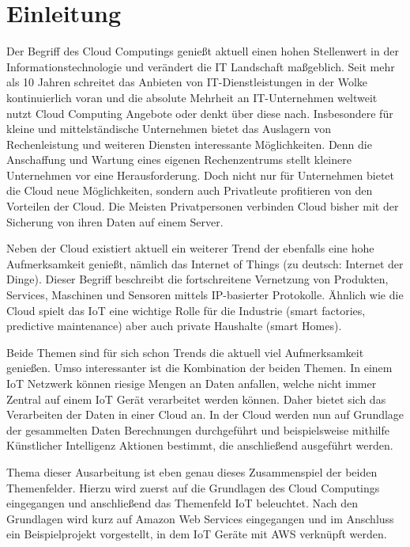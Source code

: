 \chapter{Einleitung}\label{ch:1}

Der Begriff des Cloud Computings genießt aktuell einen hohen Stellenwert in der Informationstechnologie und verändert die IT Landschaft maßgeblich. Seit mehr als 10 Jahren schreitet das Anbieten von IT-Dienstleistungen in der Wolke kontinuierlich voran und die absolute Mehrheit an IT-Unternehmen weltweit nutzt Cloud Computing Angebote oder denkt über diese nach\cite*[]{Cloud}. Insbesondere für kleine und mittelständische Unternehmen bietet das Auslagern von Rechenleistung und weiteren Diensten interessante Möglichkeiten. Denn die Anschaffung und Wartung eines eigenen Rechenzentrums stellt kleinere Unternehmen vor eine Herausforderung\cite*[]{DAAS}. Doch nicht nur für Unternehmen bietet die Cloud neue Möglichkeiten, sondern auch Privatleute profitieren von den Vorteilen der Cloud. Die Meisten Privatpersonen verbinden Cloud bisher mit der Sicherung von ihren Daten auf einem Server.

Neben der Cloud existiert aktuell ein weiterer Trend der ebenfalls eine hohe Aufmerksamkeit genießt, nämlich das Internet of Things (zu deutsch: Internet der Dinge). Dieser Begriff beschreibt die fortschreitene Vernetzung von Produkten, Services, Maschinen und Sensoren mittels IP-basierter Protokolle. Ähnlich wie die Cloud spielt das IoT eine wichtige Rolle für die Industrie (smart factories, predictive maintenance) aber auch private Haushalte (smart Homes)\cite*[]{Next}\cite*[]{Öster}. 

Beide Themen sind für sich schon Trends die aktuell viel Aufmerksamkeit genießen. Umso interessanter ist die Kombination der beiden Themen. In einem IoT Netzwerk können riesige Mengen an Daten anfallen, welche nicht immer Zentral auf einem IoT Gerät verarbeitet werden können. Daher bietet sich das Verarbeiten der Daten in einer Cloud an. In der Cloud werden nun auf Grundlage der gesammelten Daten Berechnungen durchgeführt und beispielsweise mithilfe Künstlicher Intelligenz Aktionen bestimmt, die anschließend ausgeführt werden. 

Thema dieser Ausarbeitung ist eben genau dieses Zusammenspiel der beiden Themenfelder. Hierzu wird zuerst auf die Grundlagen des Cloud Computings eingegangen und anschließend das Themenfeld IoT beleuchtet. Nach den Grundlagen wird kurz auf Amazon Web Services eingegangen und im Anschluss ein Beispielprojekt vorgestellt, in dem IoT Geräte mit AWS verknüpft werden.  
